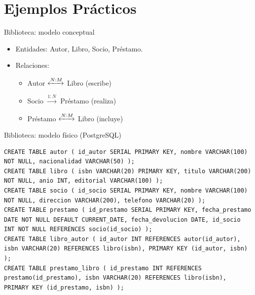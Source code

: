 \documentclass[aspectratio=169, 10pt, xcolor=table]{beamer}
\begin{document}
\section{Ejemplos Prácticos}

\begin{frame}{Biblioteca: modelo conceptual}
    \begin{itemize}
        \item Entidades: Autor, Libro, Socio, Préstamo.
        \item Relaciones:
        \begin{itemize}
            \item Autor $\xleftrightarrow{N:M}$ Libro (escribe)
            \item Socio $\xrightarrow{1:N}$ Préstamo (realiza)
            \item Préstamo $\xleftrightarrow{N:M}$ Libro (incluye)
        \end{itemize}
    \end{itemize}
\end{frame}

\begin{frame}[fragile]{Biblioteca: modelo físico (PostgreSQL)}
    \begin{lstlisting}
CREATE TABLE autor ( id_autor SERIAL PRIMARY KEY, nombre VARCHAR(100) NOT NULL, nacionalidad VARCHAR(50) );
CREATE TABLE libro ( isbn VARCHAR(20) PRIMARY KEY, titulo VARCHAR(200) NOT NULL, anio INT, editorial VARCHAR(100) );
CREATE TABLE socio ( id_socio SERIAL PRIMARY KEY, nombre VARCHAR(100) NOT NULL, direccion VARCHAR(200), telefono VARCHAR(20) );
CREATE TABLE prestamo ( id_prestamo SERIAL PRIMARY KEY, fecha_prestamo DATE NOT NULL DEFAULT CURRENT_DATE, fecha_devolucion DATE, id_socio INT NOT NULL REFERENCES socio(id_socio) );
CREATE TABLE libro_autor ( id_autor INT REFERENCES autor(id_autor), isbn VARCHAR(20) REFERENCES libro(isbn), PRIMARY KEY (id_autor, isbn) );
CREATE TABLE prestamo_libro ( id_prestamo INT REFERENCES prestamo(id_prestamo), isbn VARCHAR(20) REFERENCES libro(isbn), PRIMARY KEY (id_prestamo, isbn) );
    \end{lstlisting}
\end{frame}
\end{document}
